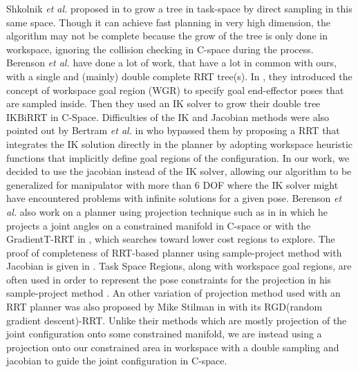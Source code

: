 \documentclass[letterpaper, 10 pt, conference]{ieeeconf}  %
\begin{document}
 Shkolnik \textit{et al.} proposed in \cite{PathPlanningIn1000} to grow a tree in task-space by direct sampling in this same space. Though it can achieve fast planning in very high dimension, the algorithm may not be complete because the grow of the tree is only done in workspace, ignoring the collision checking in C-space during the process. \\
 Berenson \textit{et al.} have done a lot of work, that have a lot in common with ours, with a single and (mainly) double complete RRT tree(s). In \cite{Berenson_WGR}, they introduced the concept of workspace goal region (WGR) to
specify goal end-effector poses that are sampled inside. Then they used an IK solver to grow their double tree IKBiRRT in C-Space.
 Difficulties of the IK and Jacobian methods were also pointed out by Bertram \textit{et al.} in \cite{Bertram_2006_5436} who bypassed them by proposing a RRT that integrates the IK solution directly in the planner by adopting workspace heuristic functions that implicitly define goal regions of the configuration.
In our work, we decided to use the jacobian instead of the IK solver, allowing our algorithm to be generalized for manipulator with more than 6 DOF where the IK solver might have  encountered problems with infinite solutions for a given pose.
Berenson \textit{et al.} also work on a planner using projection technique such as in \cite{Berenson_ConstraintManifold} in which he projects a joint angles on a constrained manifold in C-space or with the  GradientT-RRT in \cite{Berenson_Gradient}, which searches toward lower cost regions to explore. The proof of completeness of RRT-based planner using sample-project method with Jacobian is given in \cite{Berenson_2010_6558}. Task Space Regions, along with workspace goal regions, are often used in order to represent the pose constraints for the projection in his sample-project method \cite{BerensonTSR}. An other variation of projection method used with an RRT planner was also proposed by  Mike Stilman in \cite{RGD_RRT} with its RGD(random gradient descent)-RRT. Unlike their methods which are mostly projection of the joint configuration onto some constrained manifold,  we are instead using a projection onto our constrained area in workspace with a double sampling and jacobian to guide the joint configuration in C-space.
\end{document}
